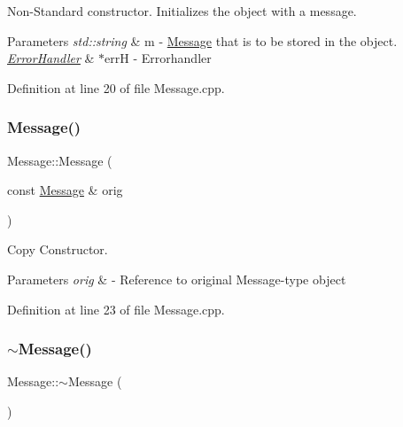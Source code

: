 Non-\/\+Standard constructor. Initializes the object with a message. 


\begin{DoxyParams}{Parameters}
{\em std\+::string} & m -\/ \mbox{\hyperlink{classMessage}{Message}} that is to be stored in the object. \\
\hline
{\em \mbox{\hyperlink{classErrorHandler}{Error\+Handler}}} & $\ast$errH -\/ Errorhandler \\
\hline
\end{DoxyParams}


Definition at line 20 of file Message.\+cpp.

\mbox{\label{classMessage_afc0cbea76e5ed74d86af6b6646fd8642}} 
\subsubsection{\texorpdfstring{Message()}{Message()}\hspace{0.1cm}{\footnotesize\ttfamily [3/3]}}
{\footnotesize\ttfamily Message\+::\+Message (\begin{DoxyParamCaption}\item[{const \mbox{\hyperlink{classMessage}{Message}} \&}]{orig }\end{DoxyParamCaption})}



Copy Constructor. 


\begin{DoxyParams}{Parameters}
{\em orig} & -\/ Reference to original Message-\/type object \\
\hline
\end{DoxyParams}


Definition at line 23 of file Message.\+cpp.

\mbox{\label{classMessage_a3f7275462831f787a861271687bcad67}} 
\subsubsection{\texorpdfstring{$\sim$Message()}{~Message()}}
{\footnotesize\ttfamily Message\+::$\sim$\+Message (\begin{DoxyParamCaption}{ }\end{DoxyParamCaption})\hspace{0.3cm}{\ttfamily [virtual]}}

